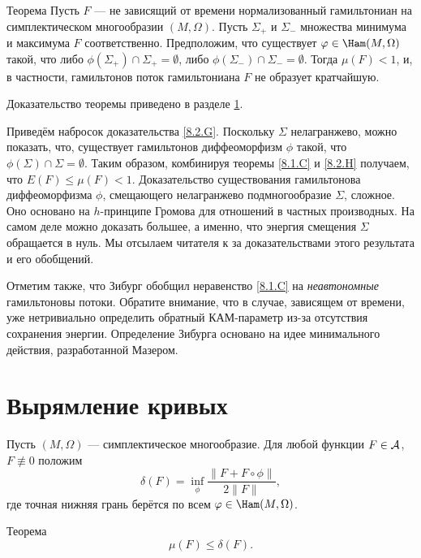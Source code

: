 \begin{thm}{Теорема}\label{8.2.H}
Пусть $F$ — не зависящий от времени нормализованный гамильтониан на
симплектическом многообразии $ (M, \Omega)$. 
Пусть $\Sigma_+$  и $\Sigma_-$ 
  множества минимума и максимума $F$ соответственно.
Предположим, что существует $\phi \in \Ham (M, \Omega)$ такой, что
либо $\phi (\Sigma_+) \cap \Sigma_+ = \emptyset$, либо $\phi
(\Sigma_-) \cap \Sigma_- = \emptyset$. 
Тогда $\mu (F) <1$, и, в частности, гамильтонов поток
гамильтониана $F$ не образует
кратчайшую.  
\end{thm}

Доказательство теоремы приведено в разделе \ref{sec:8.3}.

Приведём набросок доказательства \ref{8.2.G}.
Поскольку $\Sigma$ нелагранжево, можно показать, что, существует гамильтонов диффеоморфизм $\phi$ такой, что
$\phi(\Sigma) \cap \Sigma = \emptyset$. 
Таким образом, комбинируя теоремы \ref{8.1.C} и \ref{8.2.H} получаем,
что $E (F) \le \mu (F) <1$. 
Доказательство существования гамильтонова диффеоморфизма $\phi$,
смещающего нелагранжево подмногообразие $\Sigma$, сложное. 
Оно основано на $h$-принципе Громова для отношений в частных производных.
На самом деле можно доказать большее, а именно, что энергия смещения
$\Sigma$ обращается в нуль. 
Мы отсылаем читателя к \cite{P2,LS} за доказательствами этого
результата и его обобщений. 

Отметим также, что Зибург \cite{Si2} обобщил неравенство \ref{8.1.C}
на {}\emph{неавтономные} гамильтоновы потоки. 
Обратите внимание, что в случае, зависящем от времени, уже
нетривиально определить обратный КАМ-параметр из-за отсутствия
сохранения энергии. 
Определение Зибурга основано на идее минимального действия,
разработанной Мазером. 

\section[Вырямление кривых]{Вырямление кривых}\label{sec:8.3}

Пусть $(M, \Omega)$ — симплектическое многообразие.
Для любой функции $F \in \mathcal{A}$, $F \not\equiv 0$ положим 
\[\delta(F)=\inf_\phi \frac{\|F+ F \circ \phi\|}{2\|F\|},\]
где точная нижняя грань берётся по всем $\phi \in \Ham (M, \Omega)$.

\begin{thm}[(\cite{BP2})]{Теорема}\label{8.3.A}
\[\mu (F) \le \delta (F).\]
\end{thm}

